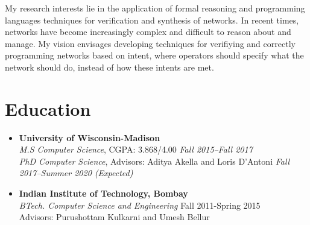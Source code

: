 \documentclass[11pt,a4paper,sans]{moderncv}        %
\begin{document}
\makecvtitle

\small{My research interests lie in the application of formal reasoning and programming languages techniques for verification and synthesis of networks. In recent times, networks have become increasingly complex and difficult to reason about and manage. My vision envisages developing techniques for verifiying and correctly programming networks based on intent, where operators should specify what the network should do, instead of how these intents are met.}

\section{Education}

\vspace{5pt}

\begin{itemize}

\item \textbf{University of Wisconsin-Madison} \\
\emph{M.S Computer Science}, CGPA: 3.868/4.00  \hfill \emph{Fall 2015--Fall 2017} \\
\emph{PhD Computer Science}, Advisors: Aditya Akella and Loris D'Antoni   \hfill \emph{Fall 2017--Summer 2020 (Expected)} \\

\item \textbf{Indian Institute of Technology, Bombay} \\
\emph{BTech. Computer Science and Engineering} \hfill Fall 2011-Spring 2015 \\
Advisors: Purushottam Kulkarni and Umesh Bellur

\end{itemize}
\end{document}
